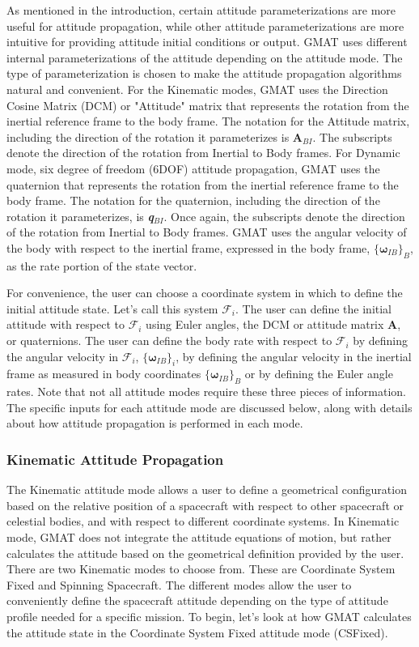 As mentioned in the introduction, certain attitude parameterizations are more
useful for attitude propagation, while other attitude parameterizations are
more intuitive for providing attitude initial conditions or output.  GMAT uses
different internal parameterizations of the attitude depending on the attitude
mode.  The type of parameterization is chosen to make the attitude propagation
algorithms natural and convenient.  For the Kinematic modes, GMAT uses the
Direction Cosine Matrix (DCM) or "Attitude" matrix that represents the rotation
from the inertial reference frame to the body frame.  The notation for the
Attitude matrix, including the direction of the rotation it parameterizes is
\textbf{A}$_{BI}$.  The subscripts denote the direction of the rotation from
Inertial to Body frames.  For Dynamic mode, six degree of freedom (6DOF)
attitude propagation, GMAT uses the quaternion that represents the rotation from
the inertial reference frame to the body frame.  The notation for the quaternion,
including the direction of the rotation it parameterizes, is
\textbf{\emph{q}}$_{BI}$.  Once again, the subscripts denote the direction of
the rotation from Inertial to Body frames.  GMAT uses the angular velocity of
the body with respect to the inertial frame, expressed in the body frame,
$\{\boldsymbol\omega_{IB}\}_B$, as the rate portion of the state vector.

For convenience, the user can choose a coordinate system in which to define the
initial attitude state.  Let's call this system $\mathcal{F}_i$.  The user can
define the initial attitude with respect to $\mathcal{F}_i$ using Euler angles,
the DCM or attitude matrix \textbf{A}, or quaternions.  The user can define the
body rate with respect to $\mathcal{F}_i$ by defining the angular velocity in
$\mathcal{F}_i$, $\{\boldsymbol\omega_{IB}\}_i$, by defining the angular
velocity in the inertial frame as measured in body coordinates
$\{\boldsymbol\omega_{IB}\}_B$ or by defining the Euler angle rates.  Note that
not all attitude modes require these three pieces of information.  The specific
inputs for each attitude mode are discussed below, along with details about how
attitude propagation is performed in each mode.

\subsubsection{Kinematic Attitude Propagation}

The Kinematic attitude mode allows a user to define a geometrical configuration
based on the relative position of a spacecraft with respect to other spacecraft
or celestial bodies, and with respect to different coordinate systems.  In
Kinematic mode, GMAT does not integrate the attitude equations of motion, but
rather calculates the attitude based on the geometrical definition provided by
the user.  There are two Kinematic modes to choose from.  These are Coordinate
System Fixed and Spinning Spacecraft.  The different modes allow the user to
conveniently define the spacecraft attitude depending on the type of attitude
profile needed for a specific mission.  To begin, let's look at how GMAT
calculates the attitude state in the Coordinate System Fixed attitude mode
(CSFixed).

